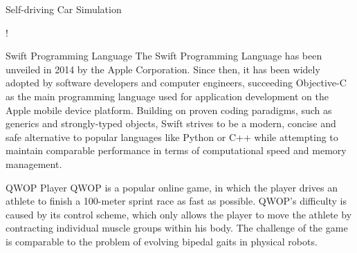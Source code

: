 \documentclass[a0paper,portrait]{baposter}
\begin{document}
\begin{poster}
\begin{posterbox}[name=car,column=1,below=arch]{Self-driving Car Simulation}
	\begin{center}
		\resizebox {\columnwidth} {!} {
		}
	\end{center}
\end{posterbox}

\begin{posterbox}[name=intro-swift,column=0,below=intro-ga,bottomaligned=car]{Swift Programming Language}
	The Swift Programming Language has been unveiled in 2014 by the Apple Corporation. Since then, it has been widely adopted by software developers and computer engineers, succeeding Objective-C as the main programming language used for application development on the Apple mobile device platform. Building on proven coding paradigms, such as generics and strongly-typed objects, Swift strives to be a modern, concise and safe alternative to popular languages like Python or C++ while attempting to maintain comparable performance in terms of computational speed and memory management.
\end{posterbox}

\begin{posterbox}[name=qwop,column=2]{QWOP Player}
	QWOP \cite{QwopWebsite} is a popular online game, in which the player drives an athlete to finish a 100-meter sprint race as fast as possible. QWOP's difficulty is caused by its control scheme, which only allows the player to move the athlete by contracting individual muscle groups within his body. The challenge of the game is comparable to the problem of evolving bipedal gaits in physical robots.

	\vspace{0.5em}


\end{posterbox}
\end{poster}
\end{document}
